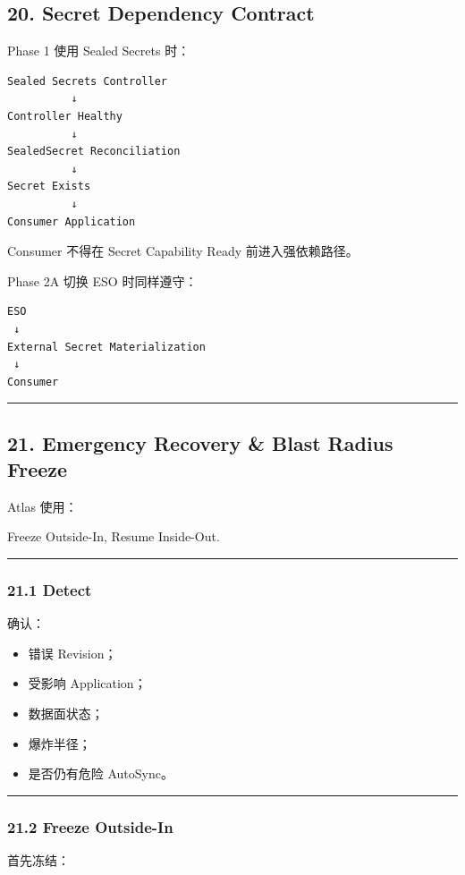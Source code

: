 \documentclass[11pt,a4paper]{article}
\begin{document}
\subsection{20. Secret Dependency Contract}
Phase 1 使用 Sealed Secrets 时：

\begin{lstlisting}[language=text]
Sealed Secrets Controller
          ↓
Controller Healthy
          ↓
SealedSecret Reconciliation
          ↓
Secret Exists
          ↓
Consumer Application
\end{lstlisting}
Consumer 不得在 Secret Capability Ready 前进入强依赖路径。

Phase 2A 切换 ESO 时同样遵守：

\begin{lstlisting}[language=text]
ESO
 ↓
External Secret Materialization
 ↓
Consumer
\end{lstlisting}
\vspace{0.5em}\hrule\vspace{0.5em}
\subsection{21. Emergency Recovery \& Blast Radius Freeze}
Atlas 使用：

\begin{gfmBlockquote}
Freeze Outside-In, Resume Inside-Out.
\end{gfmBlockquote}
\vspace{0.5em}\hrule\vspace{0.5em}
\subsubsection{21.1 Detect}
确认：

\begin{itemize}
  \item 错误 Revision；
  \item 受影响 Application；
  \item 数据面状态；
  \item 爆炸半径；
  \item 是否仍有危险 AutoSync。
\end{itemize}
\vspace{0.5em}\hrule\vspace{0.5em}
\subsubsection{21.2 Freeze Outside-In}
首先冻结：
\end{document}
